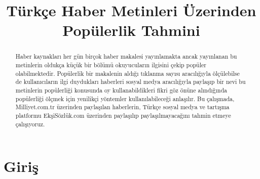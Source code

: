 \documentclass[conference]{IEEEtran}
\begin{document}
%
\title{Türk\c{c}e Haber Metinleri Üzerinden Popülerlik Tahmini}


\author{
\and
{}
\and
{}
}


\maketitle

\begin{abstract}
Haber kaynaklar{\i} her gün bir\c{c}ok haber makalesi yay{\i}nlamakta ancak yay{\i}nlanan bu metinlerin olduk\c{c}a kü\c{c}ük bir bölümü okuyucular{\i}n ilgisini \c{c}ekip popüler olabilmektedir. Popülerlik bir makalenin ald{\i}\u{g}{\i} t{\i}klanma say{\i}s{\i} arac{\i}l{\i}\u{g}{\i}yla öl\c{c}ülebilse de kullan{\i}c{\i}lar{\i}n ilgi duyduklar{\i} haberleri sosyal medya arac{\i}l{\i}\u{g}{\i}yla payla\c{s}{\i}p bir nevi bu metinlerin popülerli\u{g}i konusunda oy kullanabildikleri fikri göz önüne al{\i}nd{\i}\u{g}{\i}nda popülerli\u{g}i öl\c{c}mek i\c{c}in yenilik\c{c}i yöntemler kullan{\i}labilece\u{g}i anla\c{s}{\i}l{\i}r. Bu \c{c}al{\i}\c{s}mada, Milliyet.com.tr üzerinden payla\c{s}{\i}lan haberlerin, Türk\c{c}e sosyal medya ve tart{\i}\c{s}ma platformu Ek\c{s}iSözlük.com üzerinden payla\c{s}{\i}l{\i}p payla\c{s}{\i}lmayaca\u{g}{\i}n{\i} tahmin etmeye \c{c}al{\i}\c{s}{\i}yoruz.
\end{abstract}

\section{Giri\c{s}}
\end{document}
